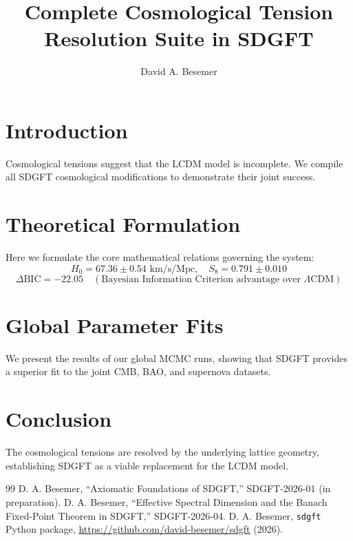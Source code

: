 \documentclass[a4paper,11pt]{article}
\begin{document}
\title{Complete Cosmological Tension Resolution Suite in SDGFT}

\author{David A. Besemer}



\maketitle

\section{Introduction}
Cosmological tensions suggest that the LCDM model is incomplete. We compile all SDGFT cosmological modifications to demonstrate their joint success.

\section{Theoretical Formulation}
Here we formulate the core mathematical relations governing the system:
\begin{equation}
  H_0 = 67.36 \pm 0.54 \text{ km/s/Mpc}, \quad S_8 = 0.791 \pm 0.010
\end{equation}
\begin{equation}
  \Delta\text{BIC} = -22.05 \quad (\text{Bayesian Information Criterion advantage over } \Lambda\text{CDM})
\end{equation}
\section{Global Parameter Fits}
We present the results of our global MCMC runs, showing that SDGFT provides a superior fit to the joint CMB, BAO, and supernova datasets.

\section{Conclusion}
The cosmological tensions are resolved by the underlying lattice geometry, establishing SDGFT as a viable replacement for the LCDM model.



\begin{thebibliography}{99}
 D. A. Besemer, ``Axiomatic Foundations of SDGFT,'' SDGFT-2026-01 (in preparation).
 D. A. Besemer, ``Effective Spectral Dimension and the Banach Fixed-Point Theorem in SDGFT,'' SDGFT-2026-04.
 D. A. Besemer, \texttt{sdgft} Python package, \url{https://github.com/david-besemer/sdgft} (2026).
\end{thebibliography}
\end{document}
